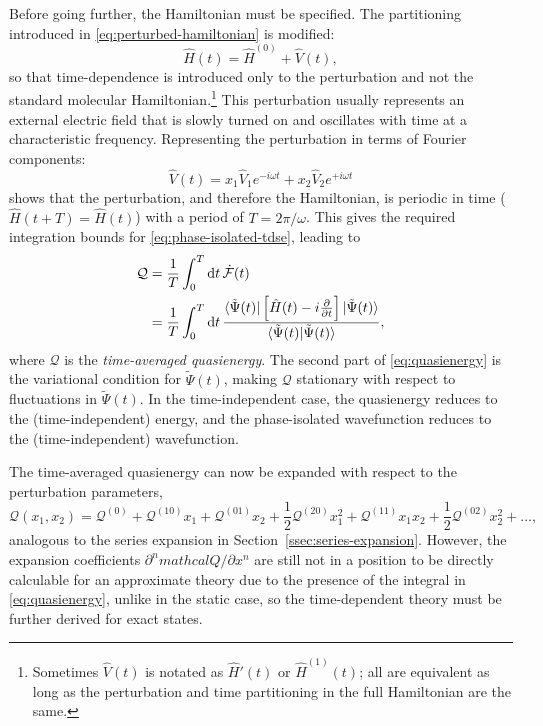 \documentclass[%
class = book,%
crop = false,%
float = true,%
multi = true,%
preview = false,%
]{standalone}
\begin{document}
Before going further, the Hamiltonian must be specified. The partitioning introduced in \eqref{eq:perturbed-hamiltonian} is modified:
\begin{equation}
  \label{eq:perturbed-hamiltonian-time-dependent}
  \hat{H}(t) = \hat{H}^{(0)} + \hat{V}(t),
\end{equation}
so that time-dependence is introduced only to the perturbation and not the standard molecular Hamiltonian.\footnote{Sometimes \(\hat{V}(t)\) is notated as \(\hat{H}'(t)\) or \(\hat{H}^{(1)}(t)\); all are equivalent as long as the perturbation and time partitioning in the full Hamiltonian are the same.} This perturbation usually represents an external electric field that is slowly turned on and oscillates with time at a characteristic frequency. Representing the perturbation in terms of Fourier components:
\begin{equation}
  \label{eq:fourier-components}
  \hat{V}(t) = x_{1} \hat{V}_{1} e^{-i\omega t} + x_{2} \hat{V}_{2} e^{+i\omega t}
\end{equation} %
shows that the perturbation, and therefore the Hamiltonian, is periodic in time (\(\hat{H}(t + T) = \hat{H}(t)\)) with a period of \(T = 2\pi/\omega\). This gives the required integration bounds for \eqref{eq:phase-isolated-tdse}, leading to
\begin{equation}
  \label{eq:quasienergy}
  \begin{aligned}
    \mathcal{Q} &= \frac{1}{T} \int_{0}^{T} \mathrm{d}t \, \dot{\mathcal{F}}(t) \\
    &= \frac{1}{T} \int_{0}^{T} \mathrm{d}t \, \frac{\bra{\tilde{\Psi}(t)} \left[ \hat{H}(t) - i\frac{\partial}{\partial t} \right] \ket{\tilde{\Psi}(t)}}{\braket{\tilde{\Psi}(t)|\tilde{\Psi}(t)}},
  \end{aligned}
\end{equation}
where \(\mathcal{Q}\) is the \emph{time-averaged quasienergy}. The second part of \eqref{eq:quasienergy} is the variational condition for \(\tilde{\Psi}(t)\), making \(\mathcal{Q}\) stationary with respect to fluctuations in \(\tilde{\Psi}(t)\). In the time-independent case, the quasienergy reduces to the (time-independent) energy, and the phase-isolated wavefunction reduces to the (time-independent) wavefunction.

The time-averaged quasienergy can now be expanded with respect to the perturbation parameters,
\begin{equation}
  \label{eq:quasienergy-expansion}
  \mathcal{Q}(x_{1},x_{2}) = \mathcal{Q}^{(0)} + \mathcal{Q}^{(10)}x_{1} + \mathcal{Q}^{(01)}x_{2} + \frac{1}{2}\mathcal{Q}^{(20)}x_{1}^{2} + \mathcal{Q}^{(11)}x_{1}x_{2} + \frac{1}{2}\mathcal{Q}^{(02)}x_{2}^{2} + \dots,
\end{equation}
analogous to the series expansion in Section~\ref{ssec:series-expansion}. However, the expansion coefficients \(\partial^{n}
mathcal{Q}/\partial x^{n}\) are still not in a position to be directly calculable for an approximate theory due to the presence of the integral in \eqref{eq:quasienergy}, unlike in the static case, so the time-dependent theory must be further derived for exact states.
\end{document}
